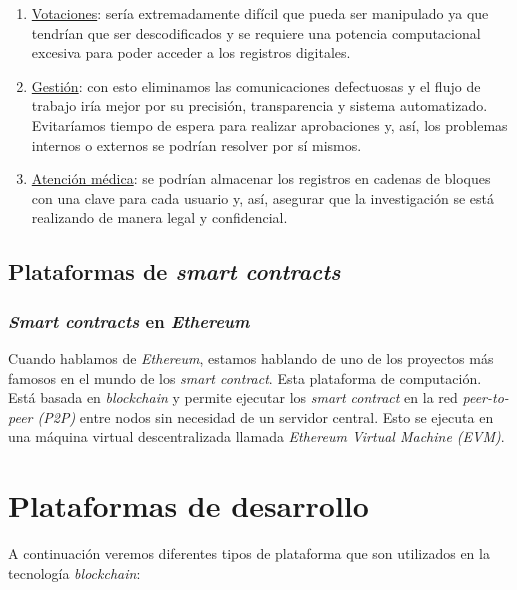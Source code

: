 \begin{enumerate}[1)]
	\item \underline{Votaciones}: sería extremadamente difícil que pueda ser manipulado ya que tendrían que ser descodificados y se requiere una potencia computacional excesiva para poder acceder a los registros digitales.
	\item \underline{Gestión}: con esto eliminamos las comunicaciones defectuosas y el flujo de trabajo iría mejor por su precisión, transparencia y sistema automatizado. Evitaríamos tiempo de espera para realizar aprobaciones y, así, los problemas internos o externos se podrían resolver por sí mismos.  
	\item \underline{Atención médica}: se podrían almacenar los registros en cadenas de bloques con una clave para cada usuario y, así, asegurar que la investigación se está realizando de manera legal y confidencial.  
\end{enumerate}

\subsection{Plataformas de \textit{smart contracts}}

\subsubsection{\textit{Smart contracts} en \textit{Ethereum}}

Cuando hablamos de \textit{Ethereum}, estamos hablando de uno de los proyectos más famosos en el mundo de los \textit{smart contract}. Esta plataforma de computación. Está basada en \textit{blockchain} y permite ejecutar los \textit{smart contract} en la red \textit{peer-to-peer (P2P)} entre nodos sin necesidad de un servidor central. Esto se ejecuta en una máquina virtual descentralizada llamada \textit{Ethereum Virtual Machine (EVM)}.


\section{Plataformas de desarrollo}
A continuación veremos diferentes tipos de plataforma que son utilizados en la tecnología \textit{blockchain}:

